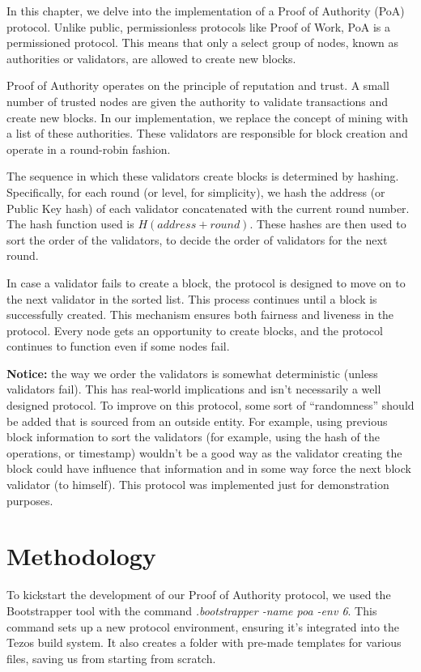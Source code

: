 In this chapter, we delve into the implementation of a Proof of Authority (PoA) protocol. Unlike public, permissionless protocols like Proof of Work, PoA is a permissioned protocol. This means that only a select group of nodes, known as authorities or validators, are allowed to create new blocks.

Proof of Authority operates on the principle of reputation and trust. A small number of trusted nodes are given the authority to validate transactions and create new blocks. In our implementation, we replace the concept of mining with a list of these authorities. These validators are responsible for block creation and operate in a round-robin fashion.

The sequence in which these validators create blocks is determined by hashing. Specifically, for each round (or level, for simplicity), we hash the address (or Public Key hash) of each validator concatenated with the current round number. The hash function used is $H(address + round)$. These hashes are then used to sort the order of the validators, to decide the order of validators for the next round.


In case a validator fails to create a block, the protocol is designed to move on to the next validator in the sorted list. This process continues until a block is successfully created. This mechanism ensures both fairness and liveness in the protocol. Every node gets an opportunity to create blocks, and the protocol continues to function even if some nodes fail.

\textbf{Notice:} the way we order the validators is somewhat deterministic (unless validators fail). This has real-world implications and isn't necessarily a well designed protocol. 
To improve on this protocol, some sort of ``randomness'' should be added that is sourced from an outside entity. For example, using previous block information to sort the validators (for example, using the hash of the operations, or timestamp) wouldn't be a good way as the validator creating the block could have influence that information and in some way force the next block validator (to himself). This protocol was implemented just for demonstration purposes.

\section{Methodology}

To kickstart the development of our Proof of Authority protocol, we used the Bootstrapper tool with the command \textit{.\/bootstrapper -name poa -env 6}. This command sets up a new protocol environment, ensuring it's integrated into the Tezos build system. It also creates a folder with pre-made templates for various files, saving us from starting from scratch.

